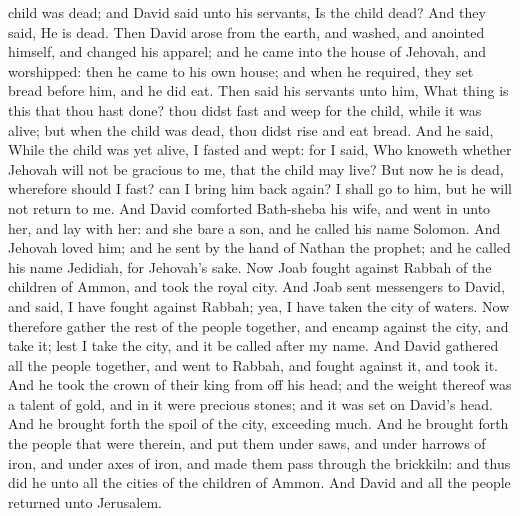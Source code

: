 child was dead; and David said unto his servants, Is the child dead? And they said, He is dead. Then David arose from the earth, and washed, and anointed himself, and changed his apparel; and he came into the house of Jehovah, and worshipped: then he came to his own house; and when he required, they set bread before him, and he did eat. Then said his servants unto him, What thing is this that thou hast done? thou didst fast and weep for the child, while it was alive; but when the child was dead, thou didst rise and eat bread. And he said, While the child was yet alive, I fasted and wept: for I said, Who knoweth whether Jehovah will not be gracious to me, that the child may live? But now he is dead, wherefore should I fast? can I bring him back again? I shall go to him, but he will not return to me.  And David comforted Bath-sheba his wife, and went in unto her, and lay with her: and she bare a son, and he called his name Solomon. And Jehovah loved him; and he sent by the hand of Nathan the prophet; and he called his name Jedidiah, for Jehovah’s sake.  Now Joab fought against Rabbah of the children of Ammon, and took the royal city. And Joab sent messengers to David, and said, I have fought against Rabbah; yea, I have taken the city of waters. Now therefore gather the rest of the people together, and encamp against the city, and take it; lest I take the city, and it be called after my name. And David gathered all the people together, and went to Rabbah, and fought against it, and took it. And he took the crown of their king from off his head; and the weight thereof was a talent of gold, and in it were precious stones; and it was set on David’s head. And he brought forth the spoil of the city, exceeding much. And he brought forth the people that were therein, and put them under saws, and under harrows of iron, and under axes of iron, and made them pass through the brickkiln: and thus did he unto all the cities of the children of Ammon. And David and all the people returned unto Jerusalem. 


